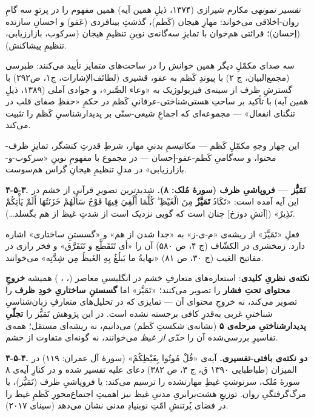 \documentclass[12pt,a4paper]{article}
\begin{document}
\begin{RTL}
\begin{otherlanguage}{persian}
\emph{تفسیر نمونه}ی مکارم شیرازی (۱۳۷۴، ذیلِ همین آیه) همین مفهوم را در
پرتوِ سه گامِ روان-اخلاقی می‌خواند: مهارِ هیجان (کَظم)، گذشتِ بینافردی (عَفو) و
احسانِ سازنده (إحسان)؛ قرائتی هم‌خوان با تمایزِ سه‌گانه‌ی نوینِ تنظیمِ هیجان
(سرکوب، بازارزیابی، تنظیمِ پیشاکنش).

سه صدای مکمّلِ دیگر همین خوانش را در ساحت‌های متمایز تأیید می‌کنند: طبرسی
(مجمع‌البیان، ج ۲) با پیوندِ کَظم به عفو، قشیری (لطائف‌الإشارات، ج۱، ص۲۹۲)
با گسترشِ ظرف از سینه‌ی فیزیولوژیک به «وعاء الصَّبر»، و جوادی آملی (۱۳۸۹،
ذیلِ همین آیه) با تأکید بر ساحتِ هستی‌شناختی-عرفانیِ کَظم در حکمِ «حفظِ صفای
قلب در تنگنای انفعال» --- مجموعه‌ای که اجماعِ شیعی-سنّی بر پدیدارشناسیِ کَظم
را تثبیت می‌کند.

این چهار وجهِ مکمّلِ کَظم --- مکانیسمِ بدنیِ مهار، شرطِ قدرتِ کنشگر، تمایزِ
ظرف-محتوا، و سه‌گامیِ کَظم-عفو-إحسان --- در مجموع با مفهومِ نوینِ
«سرکوب-و-بازارزیابی» در مدلِ تنظیمِ هیجانِ گراس هم‌سوست.

\textbf{۴-۵-۳. تَمَیُّز --- فروپاشیِ ظرف (سورۀ مُلک: ۸).} شدیدترین تصویرِ قرآنی
از خشم در این آیه آمده است: «تَكَادُ \textbf{تَمَيَّزُ} مِنَ الْغَيْظِ ۖ كُلَّمَا أُلْقِيَ
فِيهَا فَوْجٌ سَأَلَهُمْ خَزَنَتُهَا أَلَمْ يَأْتِكُمْ نَذِيرٌ» ({[}آتشِ دوزخ{]} چنان است که گویی
نزدیک است از شدتِ غیظ از هم بگسلد\ldots).

فعلِ «تَمَيَّزَ» از ریشه‌ی «م-ی-ز» به «جدا شدن از هم» و «گسستنِ ساختاری» اشاره
دارد. زمخشری در الکشّاف (ج ۴، ص ۵۸۰) آن را «أی تَتَقَطَّع و تَتَفَرَّق» و فخر رازی
در مفاتیح الغیب (ج ۳۰، ص ۸۱) «نهایةُ ما یَبلُغُ بِهِ الغَیظُ مِن شِدَّتِه» می‌خوانند.

\textbf{نکته‌ی نظریِ کلیدی}: استعاره‌های متعارفِ خشم در انگلیسیِ معاصر
(، ، ) همیشه \textbf{خروجِ
محتوای تحتِ فشار} را تصویر می‌کنند؛ «تَمَيَّز» اما \textbf{گسستنِ ساختاریِ خودِ
ظرف} را تصویر می‌کند، نه خروجِ محتوای آن --- تمایزی که در تحلیل‌های متعارفِ
زبان‌شناسیِ شناختیِ غربی به‌قدرِ کافی برجسته نشده است. در این پژوهش تَمَیُّز را
\textbf{تجلّیِ پدیدارشناختیِ مرحله‌ی ۵} (نشانه‌ی شکستِ کَظم) می‌دانیم، نه ریشه‌ای
مستقل؛ همه‌ی تفاسیرِ بررسی‌شده آن را \emph{حدّی از غیظ} می‌خوانند، نه گونه‌ای
متفاوت از خشم.

\textbf{۴-۵-۴. دو نکته‌ی بافتی-تفسیری.} آیه‌ی «قُلْ مُوتُوا بِغَيْظِكُمْ» (سورۀ آل
عمران: ۱۱۹) در المیزان (طباطبایی ۱۳۹۰ ق، ج ۳، ص ۳۸۲) دعای علیه تفسیر شده
و در کنارِ آیه‌ی ۸ سورۀ مُلک، سرنوشتِ غیظِ مهارنشده را ترسیم می‌کند: یا
فروپاشیِ ظرف (تَمَیُّز)، یا مرگ‌گرفتگیِ روان. توزیعِ هشت‌برابریِ مدنیِ غیظ نیز
اهمیتِ اجتماع‌محورِ کَظمِ غیظ را در فضای پُرتنشِ امّتِ نوبنیادِ مدنی نشان می‌دهد
(سینای ۲۰۱۷).


\end{otherlanguage}
\end{RTL}
\end{document}
